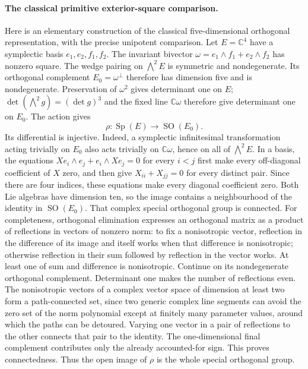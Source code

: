 \paragraph{The classical primitive exterior-square comparison.}
Here is an elementary construction of the classical five-dimensional
orthogonal representation, with the precise unipotent comparison.
Let $E=\mathbb C^4$ have a symplectic basis $e_1,e_2,f_1,f_2$.
The invariant bivector $\omega=e_1\wedge f_1+e_2\wedge f_2$ has
nonzero square. The wedge pairing on $\bigwedge^2E$ is symmetric
and nondegenerate. Its orthogonal complement
$E_0=\omega^\perp$ therefore has dimension five and is nondegenerate.
Preservation of $\omega^2$ gives determinant one on $E$;
$\det(\bigwedge^2g)=(\det g)^3$ and the fixed line
$\mathbb C\omega$ therefore give determinant one on $E_0$.
The action gives
\[
 \rho:\operatorname{Sp}(E)\longrightarrow\operatorname{SO}(E_0).
\]
Its differential is injective. Indeed, a symplectic infinitesimal
transformation acting trivially on $E_0$ also acts trivially on
$\mathbb C\omega$, hence on all of $\bigwedge^2E$. In a basis,
the equations $Xe_i\wedge e_j+e_i\wedge Xe_j=0$ for every $i<j$
first make every off-diagonal coefficient of $X$ zero, and then give
$X_{ii}+X_{jj}=0$ for every distinct pair. Since there are four
indices, these equations make every diagonal coefficient zero.
Both Lie algebras have dimension ten, so the image contains a
neighbourhood of the identity in $\operatorname{SO}(E_0)$.
That complex special orthogonal group is connected. For completeness,
orthogonal elimination expresses an orthogonal matrix as a product
of reflections in vectors of nonzero norm: to fix a nonisotropic
vector, reflection in the difference of its image and itself works
when that difference is nonisotropic; otherwise reflection in their
sum followed by reflection in the vector works. At least one of
sum and difference is nonisotropic. Continue on its nondegenerate
orthogonal complement. Determinant one makes the number of
reflections even. The nonisotropic vectors of a complex vector
space of dimension at least two form a path-connected set, since
two generic complex line segments can avoid the zero set of the
norm polynomial except at finitely many parameter values, around
which the paths can be detoured. Varying one vector in a pair of
reflections to the other connects that pair to the identity.
The one-dimensional final complement contributes only the already
accounted-for sign. This proves connectedness. Thus the open image
of $\rho$ is the whole special orthogonal group.

